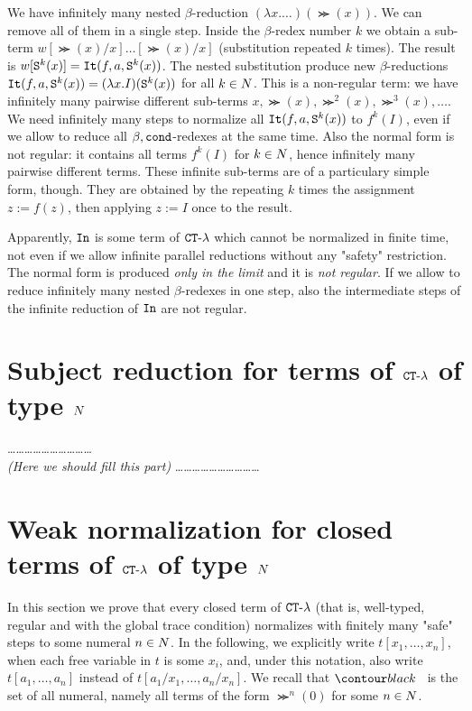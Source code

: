 \documentclass{article}
\begin{document}
We have infinitely many nested $\beta$-reduction $(\lambda x. \ldots)(\Succ (x))$.
We can remove all of them in a single step. Inside the $\beta$-redex number $k$ we obtain a sub-term
$w[\Succ (x)/x]\ldots[\Succ (x)/x]$ (substitution repeated $k$ times).
The result is $w[{\tt S} ^k(x)] = {\tt It}(f,a,{\tt S} ^k(x))$.
The nested substitution produce new $\beta$-reductions 
${\tt It}(f,a,{\tt S} ^k(x)) = (\lambda x.I)({\tt S} ^k(x))$ for all $k \in {N}$.
This is a non-regular term: we have infinitely many pairwise different 
sub-terms $x,\Succ (x),\Succ^2(x), \Succ^3(x), \ldots$.
We need infinitely many steps to normalize all ${\tt It}(f,a,{\tt S}^k(x))$ to $f^k(I)$, 
even if we allow to reduce all $\beta,{\tt cond}$-redexes at the same time.
Also the normal form is not regular: it contains all terms $f^k(I)$ for $k \in {N}$, hence
infinitely many pairwise different terms. These infinite sub-terms are of a particulary simple form, though. 
They are obtained by the repeating $k$ times the assignment $z:=f(z)$, then applying $z:=I$ once
to the result.

Apparently, ${\tt In}$  
is some term of ${ {\tt CT} \mbox{-} \lambda}$ which cannot be normalized in finite time, not even if we allow
infinite parallel reductions without any "safety" restriction. 
The normal form is produced \emph{only in the limit}
and it is \emph{not regular}. If we allow to reduce infinitely many nested $\beta$-redexes in one step, also
the intermediate steps of the infinite reduction of ${\tt In}$ are not regular.


\section{Subject reduction for terms of ${ {\tt CT} \mbox{-} \lambda}$ of type ${N}$}
\ldots\ldots\ldots\ldots\ldots\ldots\ldots\ldots\ldots\ldots
\\
\emph{(Here we should fill this part)}
\ldots\ldots\ldots\ldots\ldots\ldots\ldots\ldots\ldots\ldots


\section{Weak normalization for closed terms of ${ {\tt CT} \mbox{-} \lambda}$ of type ${N}$}
\label{section-weak-normalization}
In this section we prove that every closed term of ${ {\tt CT} \mbox{-} \lambda}$
 (that is, well-typed, regular and with the global trace condition) normalizes with finitely many "safe" steps
to some numeral $n \in {N}$.
In the following, we explicitly write $t[x_1,\ldots,x_n]$,
when each free variable in $t$ is some $x_i$, 
and, under this notation, also write $t[a_1,\ldots,a_n]$ instead of $t[a_1/x_1,\ldots,a_n/x_n]$. 
We recall that $\Nat$ is the set of all numeral, namely all terms of the form
$\Succ^n(0)$ for some $n\in {N}$.
\end{document}
